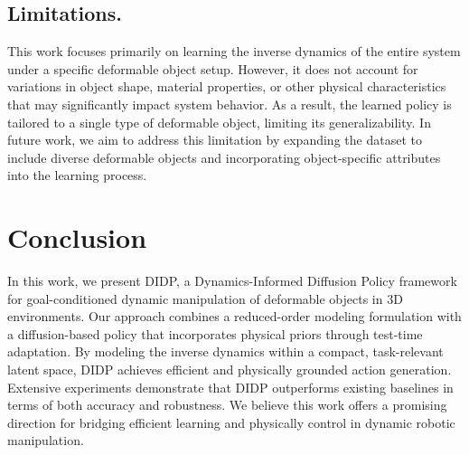\documentclass{article}
\begin{document}
 
\subsection{Limitations.}
This work focuses primarily on learning the inverse dynamics of the entire system under a specific deformable object setup. However, it does not account for variations in object shape, material properties, or other physical characteristics that may significantly impact system behavior. As a result, the learned policy is tailored to a single type of deformable object, limiting its generalizability. In future work, we aim to address this limitation by expanding the dataset to include diverse deformable objects and incorporating object-specific attributes into the learning process. %

\section{Conclusion}

In this work, we present DIDP, a Dynamics-Informed Diffusion Policy framework for goal-conditioned dynamic manipulation of deformable objects in 3D environments. Our approach combines a reduced-order modeling formulation with a diffusion-based policy that incorporates physical priors through test-time adaptation. By modeling the inverse dynamics within a compact, task-relevant latent space, DIDP achieves efficient and physically grounded action generation. Extensive experiments demonstrate that DIDP outperforms existing baselines in terms of both accuracy and robustness. We believe this work offers a promising direction for bridging efficient learning and physically control in dynamic robotic manipulation.


\setlength{\bibsep}{5pt}
%
{\small


}
\end{document}
